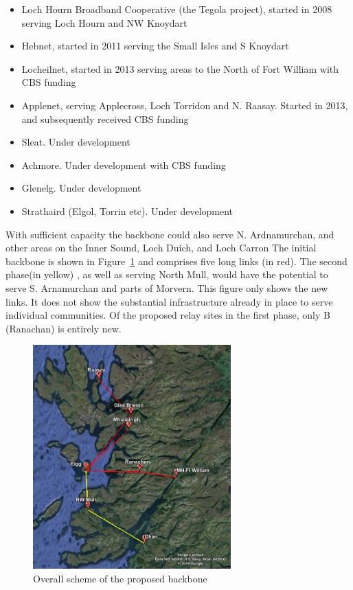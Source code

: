 \begin{itemize}

\item Loch Hourn Broadband Cooperative (the Tegola project), started in 2008 serving Loch Hourn and NW Knoydart
\item Hebnet, started in 2011 serving the Small Isles and S Knoydart
\item Locheilnet, started in 2013 serving areas to the North of Fort William with CBS funding
\item Applenet, serving Applecross, Loch Torridon and
  N. Raasay. Started in 2013, and subsequently received CBS funding
\item Sleat. Under development
\item Achmore.  Under development with CBS funding
\item Glenelg. Under development
\item Strathaird (Elgol, Torrin etc).  Under development
\end{itemize}

 
With sufficient capacity the backbone could also serve
N. Ardnamurchan,  and other areas on the Inner Sound, Loch Duich, and Loch Carron
The initial backbone is shown in Figure~\ref{longlinks} and comprises five long links (in
red).  The second phase(in yellow) , as well as serving North Mull, would have the
potential to serve S. Arnamurchan and parts of Morvern.  This figure
only shows the new links. It does not show the substantial
infrastructure already in place to serve individual communities.  Of
the proposed relay sites in the first phase, only B (Ranachan) is
entirely new.

\begin{figure}
\begin{center}
\includegraphics[width=3in]{longlinks.png}
\end{center}
\caption{Overall scheme of the proposed backbone}
\label{longlinks}
\end{figure}





